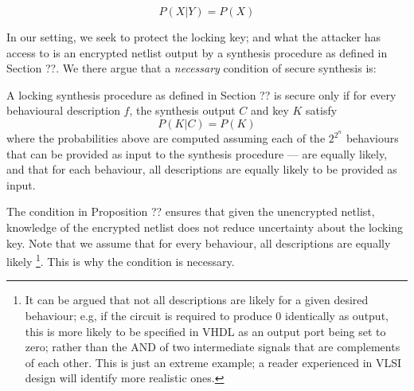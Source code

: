 $$ P(X|Y) = P(X) $$

In our setting, we seek to protect the locking key; and what the attacker has access to is an encrypted netlist output by a synthesis procedure as defined in Section ??. We there argue that a \emph{necessary} condition of secure synthesis is:

\begin{proposition}
A locking synthesis procedure as defined in Section ?? is secure only if for every behavioural description $f$, the synthesis output $C$ and key $K$ satisfy 
$$ P(K|C)=P(K) $$
where the probabilities above are computed assuming each of the $2^{2^n}$ behaviours that can be provided as input to the synthesis procedure --- are equally likely, and that for each behaviour, all descriptions are equally likely to be provided as input.
\end{proposition}

The condition in Proposition ?? ensures that given the unencrypted netlist, knowledge of the encrypted netlist does not reduce uncertainty about the locking key. %
Note that we assume that for every behaviour, all descriptions are equally likely \footnote{It can be argued that not all descriptions are likely for a given desired behaviour; e.g, if the circuit is required to produce $0$ identically as output, this is more likely to be specified in VHDL as an output port being set to zero; rather than the AND of two intermediate signals that are complements of each other. This is just an extreme example; a reader experienced in VLSI design will identify more realistic ones.}. This is why the condition is necessary.

